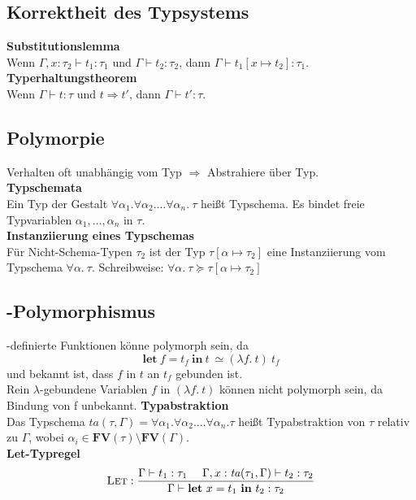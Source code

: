 \subsection{Korrektheit des Typsystems}%
\label{tg:sub:korrektheit-des-typsystems}
\textbf{Substitutionslemma}\\
Wenn \(\Gamma, x: \tau_2 \vdash t_1: \tau_1\) und \(\Gamma \vdash t_2: \tau_2\), dann \(\Gamma \vdash t_1[x \mapsto t_2]: \tau_1\).\\
\textbf{Typerhaltungstheorem}\\
Wenn \(\Gamma \vdash t: \tau\) und \(t \Rightarrow t'\), dann \(\Gamma \vdash t': \tau\).

\subsection{Polymorpie}%
\label{tg:sub:polymorphie}
Verhalten oft unabhängig vom Typ \(\Rightarrow\) Abstrahiere über Typ.\\
\textbf{Typschemata}\\
Ein Typ der Gestalt \(\forall \alpha_1. \forall \alpha_2. \ldots \forall \alpha_n.\ \tau\) heißt Typschema.
Es bindet freie Typvariablen \(\alpha_1,\ldots,\alpha_n\) in \(\tau\).\\
\textbf{Instanziierung eines Typschemas}\\
Für Nicht-Schema-Typen \(\tau_2\) ist der Typ \(\tau[\alpha \mapsto \tau_2]\) eine Instanziierung vom
Typschema \(\forall \alpha.\ \tau\). Schreibweise: \(\forall \alpha.\ \tau \succeq \tau [\alpha \mapsto \tau_2]\)

\subsection{-Polymorphismus}%
\label{tg:sub:let-polymorphismus}
-definierte Funktionen könne polymorph sein, da
\[\mathbf{let}\ f = t_f\ \mathbf{in}\ t\ \simeq (\lambda f.\ t)\ t_f\]
und bekannt ist, dass \(f\) in \(t\) an \(t_f\) gebunden ist.\\
Rein \(\lambda\)-gebundene Variablen \(f\) in \((\lambda f.\ t)\) können nicht polymorph sein, da Bindung von f unbekannt.
\textbf{Typabstraktion}\\
Das Typschema \(\mathit{ta}(\tau, \Gamma) = \forall \alpha_1. \forall \alpha_2. \ldots \forall \alpha_n. \tau\) heißt Typabstraktion
von \(\tau\) relativ zu \(\Gamma\), wobei \(\alpha_i \in \mathbf{FV}(\tau) \setminus \mathbf{FV}(\Gamma)\).\\
\textbf{Let-Typregel}\\
\begin{align*}
  \textsc{Let}: \frac{\Gamma \vdash t_1: \tau_1\ \ \ \ \Gamma, x: \mathit{ta}(\tau_1, \Gamma) \vdash t_2: \tau_2}{\Gamma \vdash \mathbf{let}\ x = t_1\ \mathbf{in}\ t_2: \tau_2}
\end{align*}